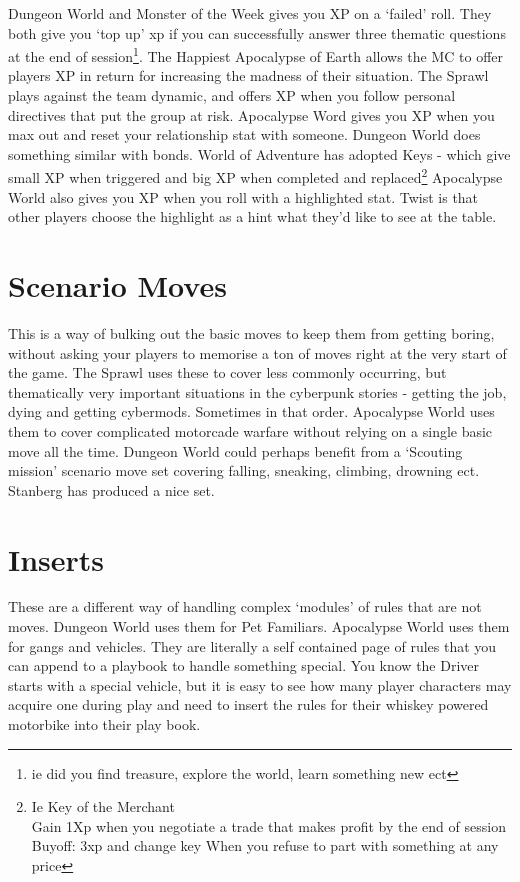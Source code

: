 \documentclass{tufte-handout}
\begin{document}
Dungeon World and Monster of the Week gives you XP on a `failed' roll.
They both give you `top up' xp if you can successfully answer three thematic questions at the end of session\footnote{ie did you find treasure, explore the world, learn something new ect}.
The Happiest Apocalypse of Earth allows the MC to offer players XP in return for increasing the madness of their situation.
The Sprawl plays against the team dynamic, and offers XP when you follow personal directives that put the group at risk.
Apocalypse Word gives you XP when you max out and reset your relationship stat with someone. Dungeon World does something similar with bonds. 
World of Adventure has adopted Keys - which give small XP when triggered and big XP when completed and replaced\footnote{Ie Key of the Merchant \\ Gain 1Xp when you negotiate a trade that makes profit by the end of session \\ Buyoff: 3xp and change key When you refuse to part with something at any price}
Apocalypse World also gives you XP when you roll with a highlighted stat. Twist is that other players choose the highlight as a hint what they'd like to see at the table. 

\section{Scenario Moves}
This is a way of bulking out the basic moves to keep them from getting boring, without asking your players to memorise a ton of moves right at the very start of the game.
The Sprawl uses these to cover less commonly occurring, but thematically very important situations in the cyberpunk stories - getting the job, dying and getting cybermods. Sometimes in that order.
Apocalypse World uses them to cover complicated motorcade warfare without relying on a single basic move all the time. 
Dungeon World could perhaps benefit from a `Scouting mission' scenario move set covering falling, sneaking, climbing, drowning ect. Stanberg has produced a nice set. 


\section{Inserts}
These are a different way of handling complex `modules' of rules that are not moves. Dungeon World uses them for Pet Familiars. Apocalypse World uses them for gangs and vehicles. They are literally a self contained page of rules that you can append to a playbook to handle something special. 
You know the Driver starts with a special vehicle, but it is easy to see how many player characters may acquire one during play and need to insert the rules for their whiskey powered motorbike into their play book.
\end{document}
